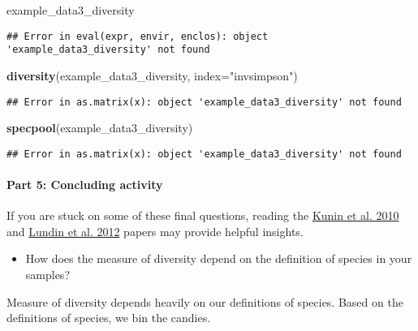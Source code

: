 \documentclass[]{article}
\newenvironment{Shaded}{\begin{snugshade}}{\end{snugshade}}
\newcommand{\KeywordTok}[1]{\textcolor[rgb]{0.13,0.29,0.53}{\textbf{#1}}}
\newcommand{\DataTypeTok}[1]{\textcolor[rgb]{0.13,0.29,0.53}{#1}}
\newcommand{\StringTok}[1]{\textcolor[rgb]{0.31,0.60,0.02}{#1}}
\newcommand{\NormalTok}[1]{#1}
\providecommand{\tightlist}{%
  \setlength{\itemsep}{0pt}\setlength{\parskip}{0pt}}
\let\oldparagraph\paragraph
\renewcommand{\paragraph}[1]{\oldparagraph{#1}\mbox{}}
\begin{document}
\begin{Shaded}
\begin{Highlighting}[]
\NormalTok{example_data3_diversity}
\end{Highlighting}
\end{Shaded}

\begin{verbatim}
## Error in eval(expr, envir, enclos): object 'example_data3_diversity' not found
\end{verbatim}

\begin{Shaded}
\begin{Highlighting}[]
\KeywordTok{diversity}\NormalTok{(example_data3_diversity, }\DataTypeTok{index=}\StringTok{"invsimpson"}\NormalTok{)}
\end{Highlighting}
\end{Shaded}

\begin{verbatim}
## Error in as.matrix(x): object 'example_data3_diversity' not found
\end{verbatim}

\begin{Shaded}
\begin{Highlighting}[]
\KeywordTok{specpool}\NormalTok{(example_data3_diversity)}
\end{Highlighting}
\end{Shaded}

\begin{verbatim}
## Error in as.matrix(x): object 'example_data3_diversity' not found
\end{verbatim}

\paragraph{Part 5: Concluding
activity}\label{part-5-concluding-activity}

If you are stuck on some of these final questions, reading the
\href{https://www.ncbi.nlm.nih.gov/pubmed/19725865}{Kunin et al. 2010}
and \href{https://www.ncbi.nlm.nih.gov/pubmed/23760801}{Lundin et al.
2012} papers may provide helpful insights.

\begin{itemize}
\tightlist
\item
  How does the measure of diversity depend on the definition of species
  in your samples?
\end{itemize}

Measure of diversity depends heavily on our definitions of species.
Based on the definitions of species, we bin the candies.
\end{document}
